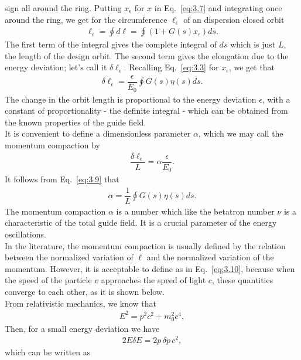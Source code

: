 sign all around the ring. Putting $x_\epsilon$ for $x$ in Eq.~\eqref{eq:3.7} and integrating
once around the ring, we get for the circumference $\ell_\epsilon$ of an dispersion
closed orbit
\begin{align}
	\ell_\epsilon = \oint d\ell = \oint (1 + G(s)x_\epsilon)ds.
\end{align}
The first term of the integral gives the complete integral of $ds$ which is just $L$, the length of the design orbit. The second term gives the elongation due to the energy deviation; let's call it $\delta \ell_\epsilon$. Recalling Eq.~\eqref{eq:3.3} for $x_\epsilon$, we get that
\begin{align} \label{eq:3.9}
	\delta\ell_\epsilon = \dfrac{\epsilon}{E_0} \oint G(s) \eta(s) ds.
\end{align}
The change in the orbit length is proportional to the energy deviation $\epsilon$, with a constant of proportionality - the definite integral - which can be obtained from the known properties of the guide field.\\
It is convenient to define a dimensionless parameter $\alpha$, which we may call the momentum compaction by
\begin{align}\label{eq:3.10}
	\dfrac{\delta \ell_\epsilon}{L} = \alpha \dfrac{\epsilon}{E_0}.
\end{align}
It follows from Eq.~\eqref{eq:3.9} that
\begin{align}\label{eq:3.11}
	\alpha = \dfrac{1}{L} \oint G(s) \eta(s) ds.
\end{align}
The momentum compaction $\alpha$ is a number which like the betatron number $\nu$ is a characteristic of the total guide field. It is a crucial parameter of the energy oscillations.\\
In the literature, the momentum compaction is usually defined by the relation between the normalized variation of $\ell$ and the normalized variation of the momentum. However, it is acceptable to define as in Eq.~\eqref{eq:3.10}, because when the speed of the particle $v$ approaches the speed of light $c$, these quantities converge to each other, as it is shown below.\\
From relativistic mechanics, we know that
\begin{align}\label{eq:}
	E^2 = p^2c^2 + m_0^2 c^4,
\end{align}
Then, for a small energy deviation we have
\begin{align}
	2 E \delta E = 2p \,\delta p \, c^2,
\end{align}
which can be written as
